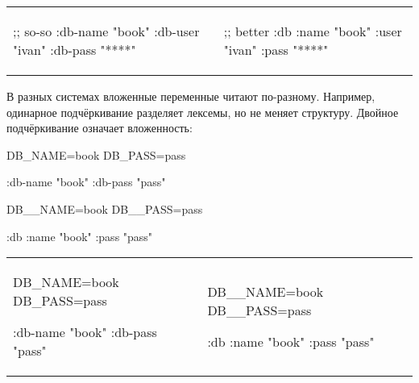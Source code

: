 \else

\begin{english}

\noindent
\begin{tabular}{ @{}p{5cm} @{}p{5cm} }

  \begin{clojure}
;; so-so
{:db-name "book"
 :db-user "ivan"
 :db-pass "****"}
  \end{clojure}

&

  \begin{clojure}
;; better
{:db {:name "book"
      :user "ivan"
      :pass "****"}}
  \end{clojure}

\end{tabular}

\end{english}

\fi

В разных системах вложенные переменные читают по-разному. Например, одинарное
подчёркивание разделяет лексемы, но не меняет структуру. Двойное подчёркивание
означает вложенность:

\ifx\devicetype\mobile

\begin{english}
  \begin{clojure}
DB_NAME=book
DB_PASS=pass

{:db-name "book"
 :db-pass "pass"}
  \end{clojure}

\splitter

  \begin{clojure}
DB__NAME=book
DB__PASS=pass

{:db {:name "book"
      :pass "pass"}}
  \end{clojure}
\end{english}

\else

\begin{english}

\noindent
\begin{tabular}{ @{}p{5cm} @{}p{5cm} }

  \begin{clojure}
DB_NAME=book
DB_PASS=pass

{:db-name "book"
 :db-pass "pass"}
  \end{clojure}

&

  \begin{clojure}
DB__NAME=book
DB__PASS=pass

{:db {:name "book"
      :pass "pass"}}
  \end{clojure}

\end{tabular}

\end{english}

